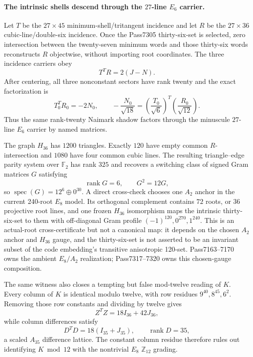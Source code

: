 \paragraph{The intrinsic shells descend through the $27$-line $E_6$ carrier.}
Let $T$ be the $27\times45$ minimum-shell/tritangent incidence and let $R$
be the $27\times36$ cubic-line/double-six incidence.  Once the Pass7305
thirty-six-set is selected, zero intersection between the twenty-seven minimum
words and those thirty-six words reconstructs $R$ objectwise, without importing
root coordinates.  The three incidence carriers obey
\[
 \boxed{T^TR=2(J-N)}.
\]
After centering, all three nonconstant sectors have rank twenty and the exact
factorization is
\[
 \boxed{T_0^TR_0=-2N_0},\qquad
 -\frac{N_0}{\sqrt{18}}=
 \left(\frac{T_0}{\sqrt6}\right)^{\!T}
 \left(\frac{R_0}{\sqrt{12}}\right).
\]
Thus the same rank-twenty Naimark shadow factors through the minuscule
$27$-line $E_6$ carrier by named matrices.

The graph $H_{36}$ has $1200$ triangles.  Exactly $120$ have empty common
$R$-intersection and $1080$ have four common cubic lines.  The resulting
triangle--edge parity system over $\mathbb F_2$ has rank $325$ and recovers a
switching class of signed Gram matrices $G$ satisfying
\[
 \boxed{\operatorname{rank}G=6,\qquad G^2=12G},
\]
so $\operatorname{spec}(G)=12^6\oplus0^{30}$.  A direct cross-check chooses
one $A_2$ anchor in the current 240-root $E_8$ model.  Its orthogonal
complement contains $72$ roots, or $36$ projective root lines, and one frozen
$H_{36}$ isomorphism maps the intrinsic thirty-six-set to them with
off-diagonal Gram profile $(-1)^{120},0^{270},1^{240}$.  This is an actual-root
cross-certificate but not a canonical map: it depends on the chosen $A_2$
anchor and $H_{36}$ gauge, and the thirty-six-set is not asserted to be an
invariant subset of the code embedding's transitive anisotropic 120-set.
Pass7163--7170
 owns the ambient
$E_8/A_2$ realization; Pass7317--7320 owns this chosen-gauge composition.

The same witness also closes a tempting but false mod-twelve reading of $K$.
Every column of $K$ is identical modulo twelve, with row residues
$9^{40},8^{45},6^2$.  Removing those row constants and dividing by twelve gives
\[
 Z^TZ=18I_{36}+42J_{36},
\]
while column differences satisfy
\[
 D^TD=18(I_{35}+J_{35}),\qquad \operatorname{rank}D=35,
\]
a scaled $A_{35}$ difference lattice.  The constant column residue therefore
rules out identifying $K\bmod12$ with the nontrivial $E_8$ $\mathbb Z_{12}$
grading.

